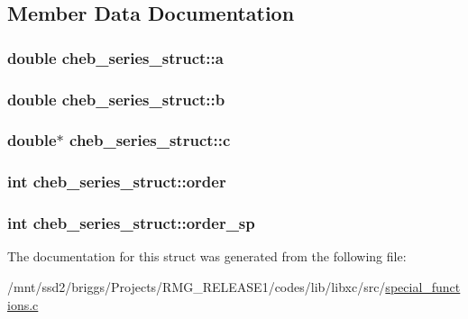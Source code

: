 \subsection{Member Data Documentation}
\hypertarget{structcheb__series__struct_aafe2f7b18fe3c9c9594f2a7ef9b17e14}{
\subsubsection[{a}]{\setlength{\rightskip}{0pt plus 5cm}double cheb\-\_\-series\-\_\-struct\-::a}}\label{structcheb__series__struct_aafe2f7b18fe3c9c9594f2a7ef9b17e14}
\hypertarget{structcheb__series__struct_ae1c3a9576879f0b9ce4b1d469f853d38}{
\subsubsection[{b}]{\setlength{\rightskip}{0pt plus 5cm}double cheb\-\_\-series\-\_\-struct\-::b}}\label{structcheb__series__struct_ae1c3a9576879f0b9ce4b1d469f853d38}
\hypertarget{structcheb__series__struct_ac73ee88973d648e32584903f5661f6e5}{
\subsubsection[{c}]{\setlength{\rightskip}{0pt plus 5cm}double$\ast$ cheb\-\_\-series\-\_\-struct\-::c}}\label{structcheb__series__struct_ac73ee88973d648e32584903f5661f6e5}
\hypertarget{structcheb__series__struct_afb77d588f75caf48fdb4a5fd17294989}{
\subsubsection[{order}]{\setlength{\rightskip}{0pt plus 5cm}int cheb\-\_\-series\-\_\-struct\-::order}}\label{structcheb__series__struct_afb77d588f75caf48fdb4a5fd17294989}
\hypertarget{structcheb__series__struct_a3ead2944f44a9d8e263ec1bf3e9efc44}{
\subsubsection[{order\-\_\-sp}]{\setlength{\rightskip}{0pt plus 5cm}int cheb\-\_\-series\-\_\-struct\-::order\-\_\-sp}}\label{structcheb__series__struct_a3ead2944f44a9d8e263ec1bf3e9efc44}


The documentation for this struct was generated from the following file\-:\begin{DoxyCompactItemize}
\item 
/mnt/ssd2/briggs/\-Projects/\-R\-M\-G\-\_\-\-R\-E\-L\-E\-A\-S\-E1/codes/lib/libxc/src/\hyperlink{special__functions_8c}{special\-\_\-functions.\-c}\end{DoxyCompactItemize}
